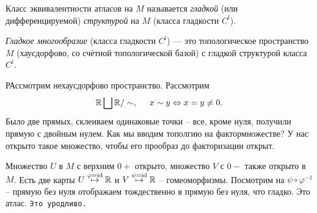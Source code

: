 \begin{to_def} 
    Класс эквивалентности атласов на $M$ называется \textit{гладкой} (или дифференцируемой) \textit{структурой} на $M$ (класса гладкости $C^l$).
\end{to_def}

\begin{to_def} 
    \textit{Гладкое многообразие} (класса гладкости $C^l$) --- это топологическое пространство $M$ (хаусдорфово, со счётной топологической базой) с гладкой структурой класса $C^l$. 
\end{to_def}


\begin{to_exm} 
    РАссмотрим нехаусдорфово пространство. Рассмотрим 
    \begin{equation*}
         \mathbb{R} \bigsqcup \mathbb{R}/\sim, \hspace{0.5cm} x \sim y \Leftrightarrow x = y \neq 0.
     \end{equation*} 
     Было две прямых, склеиваем одинаковые точки -- все, кроме нуля, получили прямую с двойным нулем. 
     Как мы вводим тополгию на фактормножестве? У нас открыто такое множество, чтобы его прообраз до факторизации открыт. 

    Множество $U$  в $M$ с верхним $0+$ открыто, множество $V$  с $0-$ также открыто в $M$. 
    Есть две карты $U \overset{\varphi = \mathop{\mathrm{id}}\nolimits}{\mapsto} \mathbb{R}$ и $V\overset{\psi = \mathop{\mathrm{id}}\nolimits}{\mapsto} \mathbb{R}$ -- гомеоморфизмы. Посмотрим на $\psi \circ \varphi^{-1}$ -- прямую без нуля отображаем тождественно в прямую без нуля, что гладко. Это атлас. \texttt{Это уродливо.}
\end{to_exm}

